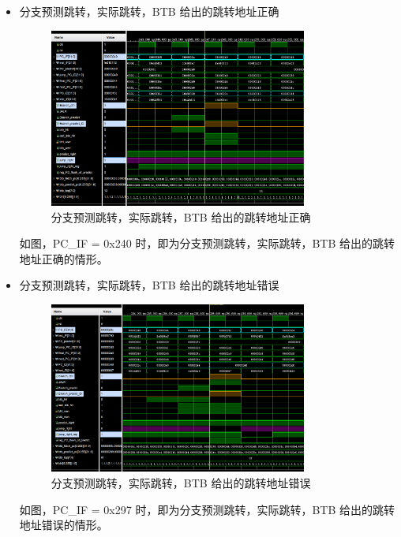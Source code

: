 \documentclass{article}
\begin{document}
\begin{enumerate}
\begin{itemize}
        \newpage
        \item 分支预测跳转，实际跳转，BTB 给出的跳转地址正确\par
        \begin{figure}[h]
            \centering
            \includegraphics[width=0.8\textwidth]{image/thinking2_fig2.png}
            \caption{分支预测跳转，实际跳转，BTB 给出的跳转地址正确}
        \end{figure}
        如图，PC\_IF = 0x240 时，即为分支预测跳转，实际跳转，BTB 给出的跳转地址正确的情形。\par

        \newpage
        \item 分支预测跳转，实际跳转，BTB 给出的跳转地址错误\par
        \begin{figure}[h]
            \centering
            \includegraphics[width=0.8\textwidth]{image/thinking2_fig3.png}
            \caption{分支预测跳转，实际跳转，BTB 给出的跳转地址错误}
        \end{figure}
        如图，PC\_IF = 0x297 时，即为分支预测跳转，实际跳转，BTB 给出的跳转地址错误的情形。\par
        

\end{itemize}
\end{enumerate}
\end{document}
